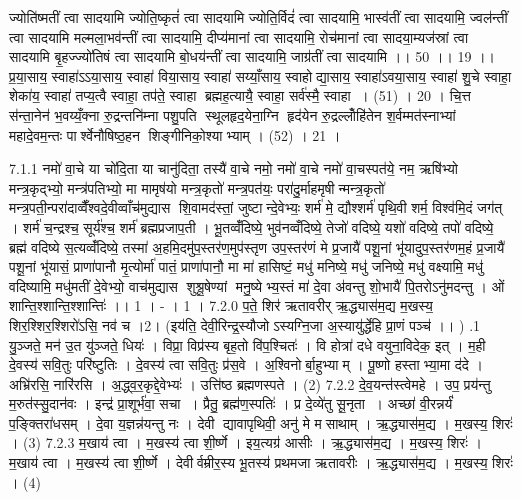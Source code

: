 ज्योति॑ष्मतीं त्वा सादयामि ज्योति॒ष्कृतं॑ त्वा सादयामि ज्योति॒र्विदं॑ त्वा सादयामि॒ भास्व॑तीं त्वा सादयामि॒ ज्वल॑न्तीं त्वा सादयामि मल्मला॒भव॑न्तीं त्वा सादयामि॒ दीप्य॑मानां त्वा सादयामि॒ रोच॑मानां त्वा सादया॒म्यज॑स्रां त्वा सादयामि बृ॒हज्ज्यो॑तिषं त्वा सादयामि बो॒धय॑न्तीं त्वा सादयामि॒ जाग्र॑तीं त्वा सादयामि ।। 50 ।। 19 ।।
प्र॒या॒साय॒ स्वाहा॑ऽऽया॒साय॒ स्वाहा॑ विया॒साय॒ स्वाहा॑ सय्याँ॒साय॒ स्वाहोद्या॒साय॒ स्वाहा॑ऽवया॒साय॒ स्वाहा॑ शु॒चे स्वाहा॒ शेका॑य॒ स्वाहा॑ तप्य॒त्वै स्वाहा॒ तप॑ते॒ स्वाहा ब्रह्मह॒त्यायै॒ स्वाहा॒ सर्व॑स्मै॒ स्वाहा । (51) । 20 ।
चि॒त्त स॑न्ता॒नेन॑ भ॒वय्यँ॒क्ना रु॒द्रन्तनि॑म्ना पशु॒पति॑ स्थूलहृद॒येना॒ग्नि हृद॑येन रु॒द्रल्लोँहि॑तेन श॒र्वम्मत॑स्नाभ्यां महादे॒वम॒न्तः पार्श्वेनौषिष्ठ॒हन शिङ्गीनिको॒श्याभ्याम् । (52) । 21 ।
\anuvakamend

\setcounter{anuvakam}{0}
7.1.1
नमो॑ वा॒चे या चो॑दि॒ता या चानु॑दिता॒ तस्यै॑ वा॒चे नमो॒ नमो॑ वा॒चे नमो॑ वा॒चस्पत॑ये॒ नम॒ ऋषि॑भ्यो मन्त्र॒कृद्भ्यो॒ मन्त्र॑पतिभ्यो॒ मा मामृष॑यो मन्त्र॒कृतो॑ मन्त्र॒पत॑यः॒ परा॑दु॒र्माहमृषीन्मन्त्र॒कृतो॑ मन्त्र॒पती॒न्परा॑दाव्वैँश्वदे॒वीव्वाँच॑मुद्यास शि॒वामद॑स्तां॒ जुष्टान्दे॒वेभ्यः॒ शर्म॑ मे॒ द्यौश्शर्म॑ पृथि॒वी शर्म॒ विश्व॑मि॒दं जग॑त् । शर्म॑ च॒न्द्रश्च॒ सूर्य॑श्च॒ शर्म॑ ब्रह्मप्रजाप॒ती । भू॒तव्वँ॑दिष्ये॒ भुव॑नव्वँदिष्ये॒ तेजो॑ वदिष्ये॒ यशो॑ वदिष्ये॒ तपो॑ वदिष्ये॒ ब्रह्म॑ वदिष्ये स॒त्यव्वँ॑दिष्ये॒ तस्मा॑ अ॒हमि॒दमु॑प॒स्तर॑ण॒मुप॑स्तृण उप॒स्तर॑णं मे प्र॒जायै॑ पशू॒नां भू॑यादुप॒स्तर॑णम॒हं प्र॒जायै॑ पशू॒नां भू॑यासं॒ प्राणा॑पानौ मृ॒त्योर्मा॑ पातं॒ प्राणा॑पानौ॒ मा मा॑ हासिष्टं॒ मधु॑ मनिष्ये॒ मधु॑ जनिष्ये॒ मधु॑ वक्ष्यामि॒ मधु॑ वदिष्यामि॒ मधु॑मतीं दे॒वेभ्यो॒ वाच॑मुद्यास शुश्रू॒षेण्यां मनु॒ष्येभ्य॒स्तं मा॑ दे॒वा अ॑वन्तु शो॒भायै॑ पि॒तरोऽनु॑मदन्तु । ओं शान्ति॒श्शान्ति॒श्शान्तिः॑ ।। 1 । - । 1 ।
7.2.0
प॒ते॒ शिर॑ ऋतावरीर् ऋ॒द्ध्यास॑म॒द्य म॒खस्य॒ शिर॒श्शिर॒श्शिरो॑ऽसि॒ नव॑ च ।2। (इय॑ति॒ देवी॒रिन्द्र॒स्यौजोऽस्यग्नि॒जा अ॒स्यायु॑र्द्धेहि प्रा॒णं पञ्च॑ ।। )
.1
यु॒ञ्जते॒ मन॑ उ॒त यु॑ञ्जते॒ धियः॑ । विप्रा॒ विप्र॑स्य बृह॒तो वि॑प॒श्चितः॑ । वि होत्रा॑ दधे वयुना॒विदेक॒ इत् । म॒ही दे॒वस्य॑ सवि॒तुः परि॑ष्टुतिः । दे॒वस्य॑ त्वा सवि॒तुः प्र॑स॒वे । अ॒श्विनोर्बा॒हुभ्याम् । पू॒ष्णो हस्ताभ्या॒मा द॑दे । अभ्रि॑रसि॒ नारि॑रसि । अ॒द्ध्व॒र॒कृद्दे॒वेभ्यः॑ । उत्ति॑ष्ठ ब्रह्मणस्पते । (2)
7.2.2
दे॒व॒यन्त॑स्त्वेमहे । उप॒ प्रय॑न्तु म॒रुत॑स्सु॒दान॑वः । इन्द्र॑ प्रा॒शूर्भ॑वा॒ सचा । प्रैतु॒ ब्रह्म॑ण॒स्पतिः॑ । प्र दे॒व्ये॑तु सू॒नृता । अच्छा॑ वी॒रन्नर्यं॑ प॒ङ्क्तिरा॑धसम् । दे॒वा य॒ज्ञन्न॑यन्तु नः । देवी द्यावापृथिवी॒ अनु॑ मे मसाथाम् । ऋ॒द्ध्यास॑म॒द्य । म॒खस्य॒ शिरः॑ । (3)
7.2.3
म॒खाय॑ त्वा । म॒खस्य॑ त्वा शी॒र्ष्णे । इय॒त्यग्र॑ आसीः । ऋ॒द्ध्यास॑म॒द्य । म॒खस्य॒ शिरः॑ । म॒खाय॑ त्वा । म॒खस्य॑ त्वा शी॒र्ष्णे । देवीर्वम्रीर॒स्य भू॒तस्य॑ प्रथमजा ऋतावरीः । ऋ॒द्ध्यास॑म॒द्य । म॒खस्य॒ शिरः॑ । (4)

